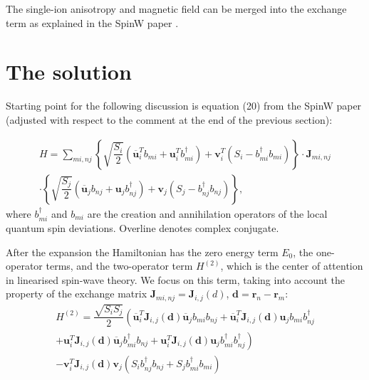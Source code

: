 \documentclass[a4paper,12pt]{article}
\begin{document}
        The single-ion anisotropy and magnetic field can be merged into the exchange term as explained in the SpinW paper \cite{toth2015linear}.

    \section{The solution}

        Starting point for the following discussion is equation (20) from the SpinW paper \cite{toth2015linear} 
        (adjusted with respect to the comment at the end of the previous section):

        \begin{multline}
            H = \sum_{mi, nj}\left\{\sqrt{\dfrac{S_{i}}{2}}\left(\overline{\boldsymbol{u}}^T_i b_{mi} + \boldsymbol{u}^T_i b^{\dag}_{mi} \right) + 
            \boldsymbol{v}^T_i(S_i - b^{\dag}_{mi}b_{mi})\right\}  \cdot
            \boldsymbol{J}_{mi, nj}\\
            \cdot\left\{\sqrt{\dfrac{S_{j}}{2}}\left(\overline{\boldsymbol{u}}_j b_{nj} + \boldsymbol{u}_j b^{\dag}_{nj} \right) + 
            \boldsymbol{v}_j(S_j - b^{\dag}_{nj}b_{nj})\right\},
        \end{multline}
        where $b^{\dag}_{mi}$ and $b_{mi}$ are the creation and annihilation operators of the local quantum spin deviations. Overline denotes complex conjugate.

        After the expansion the Hamiltonian has the zero energy term $E_0$, the one-operator terms, 
        and the two-operator term $H^{(2)}$, which is the center of attention in linearised spin-wave theory. 
        We focus on this term, taking into account the property of the exchange matrix $\boldsymbol{J}_{mi, nj} = \boldsymbol{J}_{i,j}(d)$, $\boldsymbol{d} = \boldsymbol{r}_n - \boldsymbol{r}_m$:
        \begin{multline}
            H^{(2)} = \dfrac{\sqrt{S_i S_j}}{2}\left(\overline{\boldsymbol{u}}^T_i\boldsymbol{J}_{i,j}(\boldsymbol{d})\overline{\boldsymbol{u}}_jb_{mi}b_{nj} +
            \overline{\boldsymbol{u}}^T_i\boldsymbol{J}_{i,j}(\boldsymbol{d})\boldsymbol{u}_j b_{mi}b^{\dag}_{nj}\right. \\+ 
            \left.\boldsymbol{u}^T_i\boldsymbol{J}_{i,j}(\boldsymbol{d})\overline{\boldsymbol{u}}_jb^{\dag}_{mi}b_{nj} +
            \boldsymbol{u}^T_i\boldsymbol{J}_{i,j}(\boldsymbol{d})\boldsymbol{u}_jb^{\dag}_{mi}b^{\dag}_{nj}\right) \\-
            \boldsymbol{v}^T_i\boldsymbol{J}_{i,j}(\boldsymbol{d})\boldsymbol{v}_j\left(S_ib^{\dag}_{nj}b_{nj} + S_jb^{\dag}_{mi}b_{mi}\right)
        \end{multline}
\end{document}
